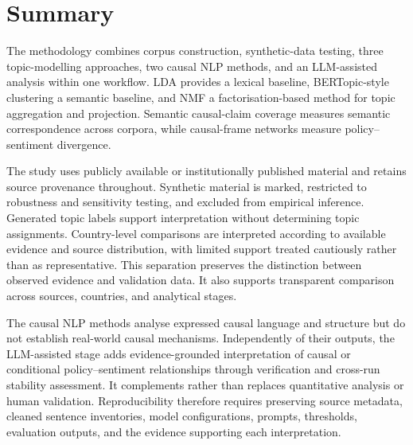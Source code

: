 \section*{Summary}

The methodology combines corpus construction, synthetic-data testing, three
topic-modelling approaches, two causal NLP methods, and an LLM-assisted analysis
within one workflow. LDA provides a lexical baseline, BERTopic-style clustering a
semantic baseline, and NMF a factorisation-based method for topic aggregation and
projection. Semantic causal-claim coverage measures semantic correspondence across
corpora, while causal-frame networks measure policy--sentiment divergence.

The study uses publicly available or institutionally published material and retains
source provenance throughout. Synthetic material is marked, restricted to robustness
and sensitivity testing, and excluded from empirical inference. Generated topic
labels support interpretation without determining topic assignments. Country-level
comparisons are interpreted according to available evidence and source distribution,
with limited support treated cautiously rather than as representative. This
separation preserves the distinction between observed evidence and validation data.
It also supports transparent comparison across sources, countries, and analytical
stages.

The causal NLP methods analyse expressed causal language and structure but do not
establish real-world causal mechanisms. Independently of their outputs, the
LLM-assisted stage adds evidence-grounded interpretation of causal or conditional
policy--sentiment relationships through verification and cross-run stability
assessment. It complements rather than replaces quantitative analysis or human
validation. Reproducibility therefore requires preserving source metadata, cleaned
sentence inventories, model configurations, prompts, thresholds, evaluation outputs,
and the evidence supporting each interpretation.